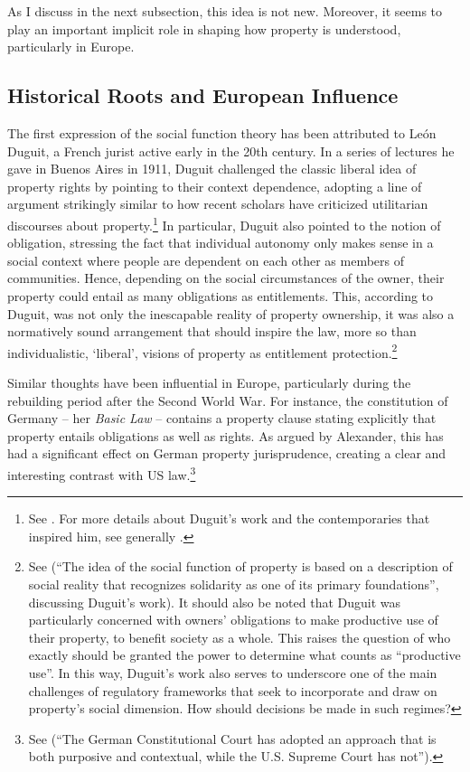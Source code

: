 As I discuss in the next subsection, this idea is not new. Moreover, it seems to play an important implicit role in shaping how property is understood, particularly in Europe.

\subsection{Historical Roots and European Influence}

The first expression of the social function theory has been attributed to Le{\'o}n Duguit, a French jurist active early in the 20th century. In a series of lectures he gave in Buenos Aires in 1911, Duguit challenged the classic liberal idea of property rights by pointing to their context dependence, adopting a line of argument strikingly similar to how recent scholars have criticized utilitarian discourses about property.\footnote{See \cite[1004-1008]{foster11}. For more details about Duguit's work and the contemporaries that inspired him, see generally \cite{mirow10}.} In particular, Duguit also pointed to the notion of obligation, stressing the fact that individual autonomy only makes sense in a social context where people are dependent on each other as members of  communities. Hence, depending on the social circumstances of the owner, their property could entail as many obligations as entitlements. This, according to Duguit, was not only the inescapable reality of property ownership, it was also a normatively sound arrangement that should inspire the law, more so than individualistic, `liberal', visions of property as entitlement protection.\footnote{See \cite[1005]{foster11} (``The idea of the social function of property is based on a description of social reality that recognizes solidarity as one of its primary foundations'', discussing Duguit's work). It should also be noted that Duguit was particularly concerned with owners' obligations to make productive use of their property, to benefit society as a whole. This raises the question of who exactly should be granted the power to determine what counts as ``productive use''. In this way, Duguit's work also serves to underscore one of the main challenges of regulatory frameworks that seek to incorporate and draw on property's social dimension. How should decisions be made in such regimes?}

Similar thoughts have been influential in Europe, particularly during the rebuilding period after the Second World War. For instance, the constitution of Germany -- her {\it Basic Law} -- contains a property clause stating explicitly that property entails obligations as well as rights. As argued by Alexander, this has had a significant effect on German property jurisprudence, creating a clear and interesting contrast with US law.\footnote{See \cite[338]{alexander03} (``The German Constitutional Court has adopted an approach that is both purposive and contextual, while the U.S. Supreme Court has not'').}

